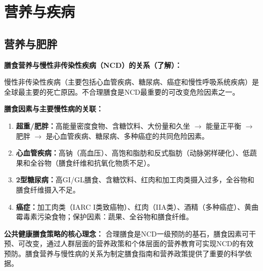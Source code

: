 \chapter{营养与疾病}

\section{营养与肥胖}

\begin{defbox}
\textbf{膳食营养与慢性非传染性疾病（NCD）的关系（了解）：}

慢性非传染性疾病（主要包括心血管疾病、糖尿病、癌症和慢性呼吸系统疾病）是全球最主要的死亡原因。不合理膳食是NCD最重要的可改变危险因素之一。

\textbf{膳食因素与主要慢性病的关联：}
\begin{enumerate}[leftmargin=*]
    \item \textbf{超重/肥胖：}高能量密度食物、含糖饮料、大份量和久坐 $\rightarrow$ 能量正平衡 $\rightarrow$ 肥胖 $\rightarrow$ 是心血管疾病、糖尿病、多种癌症的共同危险因素。
    \item \textbf{心血管疾病：}高钠（高血压）、高饱和脂肪和反式脂肪（动脉粥样硬化）、低蔬果和全谷物（膳食纤维和抗氧化物质不足）。
    \item \textbf{2型糖尿病：}高GI/GL膳食、含糖饮料、红肉和加工肉类摄入过多，全谷物和膳食纤维摄入不足。
    \item \textbf{癌症：}加工肉类（IARC I类致癌物）、红肉（IIA类）、酒精（多种癌症）、黄曲霉毒素污染食物；保护因素：蔬果、全谷物和膳食纤维。
\end{enumerate}

\textbf{公共健康膳食策略的核心理念：}
合理膳食是NCD一级预防的基石，膳食因素可干预、可改变，通过人群层面的营养政策和个体层面的营养教育可实现NCD的有效预防。膳食营养与慢性病的关系为制定膳食指南和营养政策提供了重要的科学依据。
\end{defbox}

